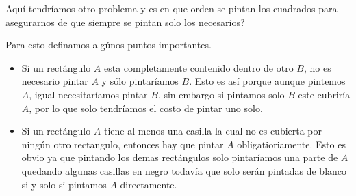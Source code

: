 \documentclass{article}
\begin{document}
Aquí tendríamos otro problema y es en que orden se pintan los cuadrados para asegurarnos de que siempre se pintan solo los necesarios?

Para esto definamos algúnos puntos importantes. 
\begin{itemize}

\item Si un rectángulo $A$ esta completamente contenido dentro de otro $B$, no es necesario pintar $A$ y sólo pintaríamos $B$. Esto es así porque aunque pintemos $A$, igual necesitaríamos pintar $B$, sin embargo si pintamos solo $B$ este cubriría $A$, por lo que solo tendríamos el costo de pintar uno solo.\\
\vspace{0.2cm}
\begin{center}


\end{center}
\item Si un rectángulo $A$ tiene al menos una casilla la cual no es cubierta por ningún otro rectangulo, entonces hay que pintar $A$ obligatioriamente. Esto es obvio ya que pintando los demas rectángulos solo pintaríamos una parte de $A$ quedando algunas casillas en negro todavía que solo serán pintadas de blanco si y solo si pintamos $A$ directamente.
\\
\vspace{0.2cm}

\begin{center}


\end{center}
\end{itemize}
\end{document}
